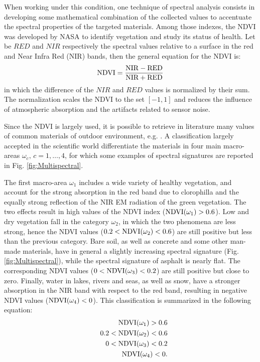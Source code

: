 \documentclass[a4paper, 10pt, conference]{ieeeconf}      %
\newcommand{\paolo}[1]{{\textcolor{red}{#1}}}
\begin{document}

When working under this condition, one technique of spectral analysis consists in developing some mathematical combination of the collected values to accentuate the spectral properties of the targeted materials.
Among those indexes, the NDVI  was developed by NASA to identify vegetation and study its status of health.
Let be $RED$ and $NIR$ respectively the spectral values relative to a surface in the red and Near Infra Red (NIR) bands, then the general equation for the NDVI is:  
%
\begin{equation} \label{eq:ndvi}
\rm NDVI=\frac{NIR-RED}{NIR+RED}
\end{equation}
%
in which the difference of the $NIR$ and $RED$ values is normalized by their sum.
The normalization scales the NDVI to the set $[-1,1]$ and reduces the influence of atmospheric absorption and  the artifacts related to sensor noise.

Since the NDVI is largely used, it is possible to retrieve in literature many values of common materials of outdoor environment, e.g. \cite{2008_PocPar}.
A classification largely accepted in the scientific world differentiate the materials in four main macro-areas $\omega_c, \, c=1, \ldots, 4$, for which some examples of spectral signatures are reported in Fig. \ref{fig:Multispectral}.

The first macro-area $\omega_1$ includes a wide variety of healthy vegetation, and account for the strong absorption in the red band due to clorophilla and the equally strong reflection of the NIR EM radiation of the green vegetation.
The two effects result in high values of the NDVI index  ($\rm{NDVI({\omega_1})}>0.6$).
Low and dry vegetation fall in the category $\omega_2$,  in which the two phenomena are less strong, hence the NDVI values  ($0.2<\rm{NDVI(\omega_2)}<0.6$) are still positive but less than the previous category.
Bare soil, as well as concrete and some other man-made materials, have in general a slightly increasing spectral signature (Fig. \ref{fig:Multispectral}), while the spectral signature of asphalt is nearly flat.
The corresponding NDVI values ($ 0<\rm{NDVI(\omega_3)}<0.2$) are still positive but close to zero.
Finally, water in lakes, rivers and seas, as well as snow, have a stronger absorption in the NIR band with respect to the red band, resulting in negative NDVI values ($\rm{NDVI(\omega_4)}<0$).
%
This classification is summarized in the following equation:
%
\begin{eqnarray}  \label{ndvi_values}
      & &\rm{NDVI(\omega_1)}>0.6 \nonumber\\
      & & 0.2<\rm{NDVI(\omega_2)}<0.6 \nonumber\\
      & & 0<\rm{NDVI(\omega_3)}<0.2\\
      & & \rm{NDVI(\omega_4)}<0 \nonumber.
\end{eqnarray}
\end{document}
